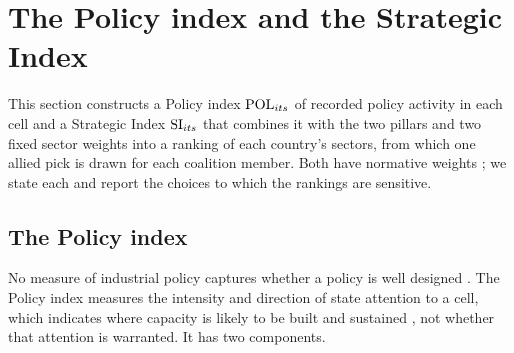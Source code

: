 \section{The Policy index and the Strategic Index}\label{sec:strategic}

This section constructs a Policy index $\mathrm{POL}_{its}$ of recorded policy activity in each cell and a
Strategic Index $\mathrm{SI}_{its}$ that combines it with the two pillars and two fixed sector weights into
a ranking of each country's sectors, from which one allied pick is drawn for each coalition member.
Both have normative weights \citep{oecd2008handbook,decancq2013weights}; we state each and report
the choices to which the rankings are sensitive.

\subsection{The Policy index}\label{subsec:policy_composite}

No measure of industrial policy captures whether a policy is well designed
\citep{juhasz2024new,juhasz2022who,evenett2024return}. The Policy index measures the intensity and
direction of state attention to a cell, which indicates where capacity is likely to be built and
sustained \citep{rodrik2004industrial,rodrik2014green}, not whether that attention is warranted. It
has two components.

